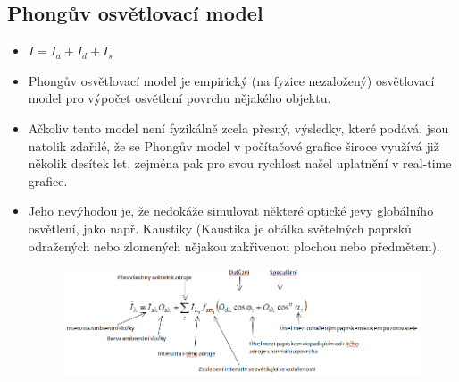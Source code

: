 \subsection*{Phongův osvětlovací model} %
\begin{itemize}
	\item $I = I_a + I_d + I_s$ 
	\item Phongův osvětlovací model je empirický (na fyzice nezaložený) osvětlovací model pro výpočet osvětlení povrchu nějakého objektu.
	\item Ačkoliv tento model není fyzikálně zcela přesný, výsledky, které podává, jsou natolik zdařilé, že se Phongův model v počítačové grafice široce využívá již několik desítek let, zejména pak pro svou rychlost našel uplatnění v real-time grafice.
	\item Jeho nevýhodou je, že nedokáže simulovat některé optické jevy globálního osvětlení, jako např. Kaustiky (Kaustika je obálka světelných paprsků odražených nebo zlomených nějakou zakřivenou plochou nebo předmětem).
%
		\begin{figure}[H]
		\centering
		\includegraphics[width=1\textwidth]{assets/1_phong_model}
		\end{figure}

\end{itemize}
